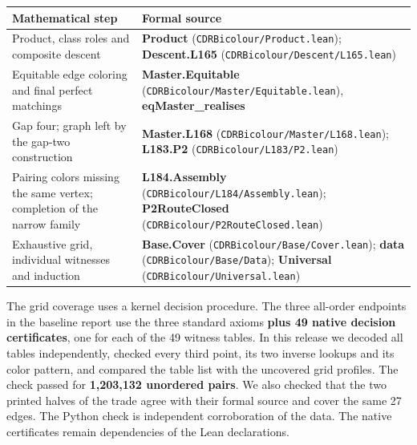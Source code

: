 \documentclass[english,11pt,a4paper]{article}
\begin{document}
{\begin{longtable}[]{@{}
  >{\raggedright\arraybackslash}p{}
  >{\raggedright\arraybackslash}p{}@{}}
\toprule\noalign{}
\begin{minipage}[b]{\linewidth}\raggedright
Mathematical step
\end{minipage} & \begin{minipage}[b]{\linewidth}\raggedright
Formal source
\end{minipage} \\
\midrule\noalign{}
\endhead
\bottomrule\noalign{}
\endlastfoot
Product, class roles and composite descent & \textbf{Product} (\texttt{CDRBicolour/\allowbreak{}Product.\allowbreak{}lean}); \textbf{Descent.L165} (\texttt{CDRBicolour/\allowbreak{}Descent/\allowbreak{}L165.\allowbreak{}lean}) \\
Equitable edge coloring and final perfect matchings & \textbf{Master.Equitable} (\texttt{CDRBicolour/\allowbreak{}Master/\allowbreak{}Equitable.\allowbreak{}lean}), \textbf{eqMaster\_\allowbreak{}realises} \\
Gap four; graph left by the gap-two construction & \textbf{Master.L168} (\texttt{CDRBicolour/\allowbreak{}Master/\allowbreak{}L168.\allowbreak{}lean}); \textbf{L183.P2} (\texttt{CDRBicolour/\allowbreak{}L183/\allowbreak{}P2.\allowbreak{}lean}) \\
Pairing colors missing the same vertex; completion of the narrow family & \textbf{L184.Assembly} (\texttt{CDRBicolour/\allowbreak{}L184/\allowbreak{}Assembly.\allowbreak{}lean}); \textbf{P2RouteClosed} (\texttt{CDRBicolour/\allowbreak{}P2Route\allowbreak{}Closed.\allowbreak{}lean}) \\
Exhaustive grid, individual witnesses and induction & \textbf{Base.Cover} (\texttt{CDRBicolour/\allowbreak{}Base/\allowbreak{}Cover.\allowbreak{}lean}); \textbf{data} (\texttt{CDRBicolour/\allowbreak{}Base/\allowbreak{}Data}); \textbf{Universal} (\texttt{CDRBicolour/\allowbreak{}Universal.\allowbreak{}lean}) \\
\end{longtable}
}

The grid coverage uses a kernel decision procedure. The three all-order endpoints in the baseline report use the three standard axioms \textbf{plus 49 native decision certificates}, one for each of the 49 witness tables. In this release we decoded all tables independently, checked every third point, its two inverse lookups and its color pattern, and compared the table list with the uncovered grid profiles. The check passed for \textbf{1,203,132 unordered pairs}. We also checked that the two printed halves of the trade agree with their formal source and cover the same 27 edges. The Python check is independent corroboration of the data. The native certificates remain dependencies of the Lean declarations.
\end{document}
